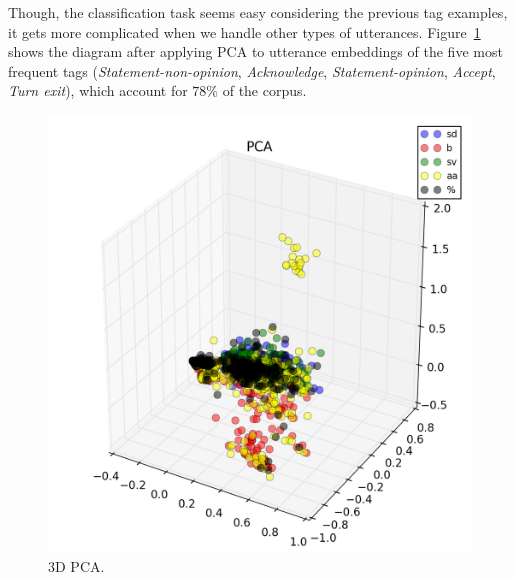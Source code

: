Though, the classification task seems easy considering the previous tag examples, it gets more complicated when we handle other types of utterances.
Figure~\ref{fig:5cat_3d_pca} shows the diagram after applying PCA to utterance embeddings of the five most frequent tags (\emph{Statement-non-opinion}, \emph{Acknowledge}, \emph{Statement-opinion}, \emph{Accept}, \emph{Turn exit}), which account for $78\%$ of the corpus.

\begin{figure}
\centering
\includegraphics[width=\columnwidth]{img/complex_pca_3d}
\caption{3D PCA.}
\label{fig:5cat_3d_pca}
\end{figure}
